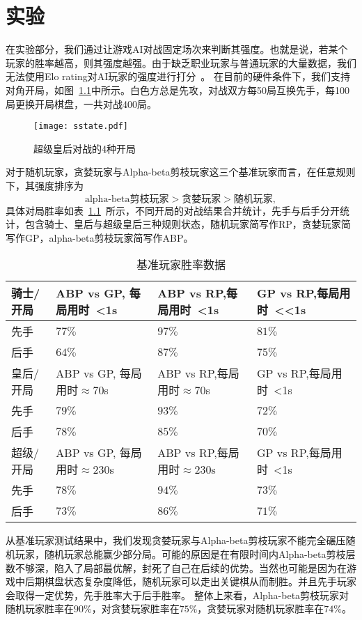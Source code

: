 \chapter{实验}
\label{chap:experiment}
在实验部分，我们通过让游戏AI对战固定场次来判断其强度。也就是说，若某个玩家的胜率越高，则其强度越强。由于缺乏职业玩家与普通玩家的大量数据，我们无法使用Elo rating对AI玩家的强度进行打分~\cite{glickman1999rating}。
在目前的硬件条件下，我们支持对角开局，如图~\ref{fig:sstate}中所示。白色方总是先攻，对战双方每50局互换先手，每100局更换开局棋盘，一共对战400局。
\begin{figure}[H]
    \centering
    \texttt{[image: sstate.pdf]}
    \caption[sstate]{%
        超级皇后对战的4种开局%
      }
    \label{fig:sstate}
\end{figure}
对于随机玩家，贪婪玩家与Alpha-beta剪枝玩家这三个基准玩家而言，在任意规则下，其强度排序为
\begin{equation*}
    \text{alpha-beta剪枝玩家} > \text{贪婪玩家} > \text{随机玩家} ,
\end{equation*}
具体对局胜率如表~\ref{table:baseresult}~所示，不同开局的对战结果合并统计，先手与后手分开统计，包含骑士、皇后与超级皇后三种规则状态，随机玩家简写作RP，贪婪玩家简写作GP，alpha-beta剪枝玩家简写作ABP。
\begin{table}[htb]
    \centering
    \caption[baseresult]{基准玩家胜率数据}
    \begin{tabular}{p{2cm}<{\centering} p{4cm}<{\centering} p{4cm}<{\centering} p{4cm}<{\centering}}
    \hline
    骑士/开局 & ABP vs GP, 每局用时~<1s & ABP vs RP,每局用时~<1s & GP vs RP,每局用时~<<1s \\ \hline
    先手 & $77\%$ & $97\%$ & $81\%$\\ 
    后手 & $64\%$ & $87\%$ & $75\%$\\ \hline
    皇后/开局 & ABP vs GP, 每局用时$\approx$70s & ABP vs RP,每局用时$\approx$70s & GP vs RP,每局用时~<1s \\ \hline
    先手 & $79\%$ & $93\%$ & $72\%$\\ 
    后手 & $78\%$ & $85\%$ & $70\%$\\ \hline
    超级/开局 & ABP vs GP, 每局用时$\approx$230s & ABP vs RP,每局用时$\approx$230s & GP vs RP,每局用时~<1s \\ \hline
    先手 & $78\%$ & $94\%$ & $73\%$\\ 
    后手 & $73\%$ & $86\%$ & $71\%$\\ \hline
    \end{tabular}
    \label{table:baseresult}
  \end{table}
从基准玩家测试结果中，我们发现贪婪玩家与Alpha-beta剪枝玩家不能完全碾压随机玩家，随机玩家总能赢少部分局。可能的原因是在有限时间内Alpha-beta剪枝层数不够深，陷入了局部最优解，封死了自己在后续的优势。当然也可能是因为在游戏中后期棋盘状态复杂度降低，随机玩家可以走出关键棋从而制胜。并且先手玩家会取得一定优势，先手胜率大于后手胜率。
整体上来看，Alpha-beta剪枝玩家对随机玩家胜率在$90\%$，对贪婪玩家胜率在$75\%$，贪婪玩家对随机玩家胜率在$74\%$。
